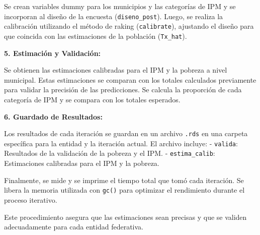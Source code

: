 \documentclass[
  12pt,
]{book}
\begin{document}
Se crean variables dummy para los municipios y las categorías de IPM y se incorporan al diseño de la encuesta (\texttt{diseno\_post}). Luego, se realiza la calibración utilizando el método de raking (\texttt{calibrate}), ajustando el diseño para que coincida con las estimaciones de la población (\texttt{Tx\_hat}).

\textbf{5. Estimación y Validación:}

Se obtienen las estimaciones calibradas para el IPM y la pobreza a nivel municipal. Estas estimaciones se comparan con los totales calculados previamente para validar la precisión de las predicciones. Se calcula la proporción de cada categoría de IPM y se compara con los totales esperados.

\textbf{6. Guardado de Resultados:}

Los resultados de cada iteración se guardan en un archivo \texttt{.rds} en una carpeta específica para la entidad y la iteración actual. El archivo incluye:
- \texttt{valida}: Resultados de la validación de la pobreza y el IPM.
- \texttt{estima\_calib}: Estimaciones calibradas para el IPM y la pobreza.

Finalmente, se mide y se imprime el tiempo total que tomó cada iteración. Se libera la memoria utilizada con \texttt{gc()} para optimizar el rendimiento durante el proceso iterativo.

Este procedimiento asegura que las estimaciones sean precisas y que se validen adecuadamente para cada entidad federativa.
\end{document}
